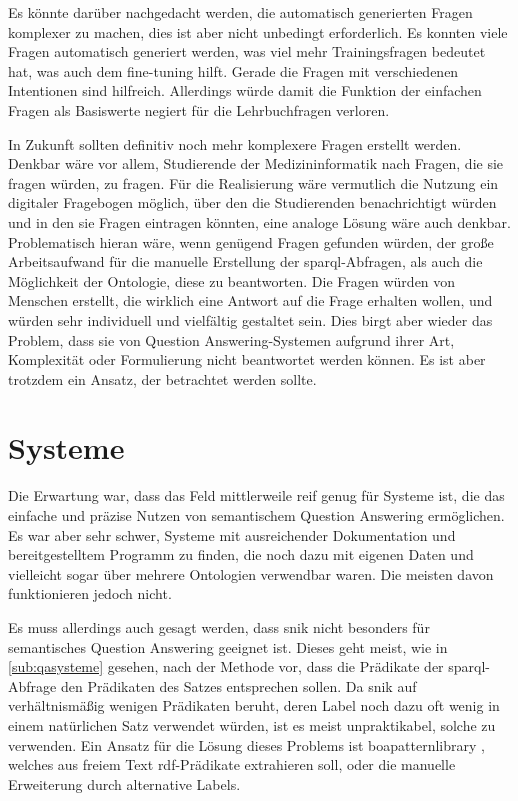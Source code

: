 Es könnte darüber nachgedacht werden, die automatisch generierten Fragen komplexer zu machen, dies ist aber nicht unbedingt erforderlich.
Es konnten viele Fragen automatisch generiert werden, was viel mehr Trainingsfragen bedeutet hat, was auch dem fine-tuning hilft.
Gerade die Fragen mit verschiedenen Intentionen sind hilfreich.
Allerdings würde damit die Funktion der einfachen Fragen als Basiswerte negiert für die Lehrbuchfragen verloren. 

In Zukunft sollten definitiv noch mehr komplexere Fragen erstellt werden.
Denkbar wäre vor allem, Studierende der Medizininformatik nach Fragen, die sie fragen würden, zu fragen.
Für die Realisierung wäre vermutlich die Nutzung ein digitaler Fragebogen möglich, über den die Studierenden benachrichtigt würden und in den sie Fragen eintragen könnten,
eine analoge Lösung wäre auch denkbar.
Problematisch hieran wäre, wenn genügend Fragen gefunden würden, der große Arbeitsaufwand für die manuelle Erstellung der \ac{sparql}-Abfragen, als auch die Möglichkeit der Ontologie, diese zu beantworten.
Die Fragen würden von Menschen erstellt, die wirklich eine Antwort auf die Frage erhalten wollen, und würden sehr individuell und vielfältig gestaltet sein.
Dies birgt aber wieder das Problem, dass sie von Question Answering-Systemen aufgrund ihrer Art, Komplexität oder Formulierung nicht beantwortet werden können.
Es ist aber trotzdem ein Ansatz, der betrachtet werden sollte.

\section{Systeme}

Die Erwartung war, dass das Feld mittlerweile reif genug für Systeme ist, die das einfache und präzise Nutzen von semantischem Question Answering ermöglichen.
Es war aber sehr schwer, Systeme mit ausreichender Dokumentation und bereitgestelltem Programm zu finden, die noch dazu mit eigenen Daten und vielleicht sogar über mehrere Ontologien verwendbar waren.
Die meisten davon funktionieren jedoch nicht.

Es muss allerdings auch gesagt werden, dass \ac{snik} nicht besonders für semantisches Question Answering geeignet ist.
Dieses geht meist, wie in \cref{sub:qasysteme} gesehen, nach der Methode vor, dass die Prädikate der \ac{sparql}-Abfrage den Prädikaten des Satzes entsprechen sollen.
Da \ac{snik} auf verhältnismäßig wenigen Prädikaten beruht, deren Label noch dazu oft wenig in einem natürlichen Satz verwendet würden, ist es meist unpraktikabel, solche zu verwenden.
Ein Ansatz für die Lösung dieses Problems ist \ac{boapatternlibrary} \citep{boa}, welches aus freiem Text \ac{rdf}-Prädikate extrahieren soll, oder die manuelle Erweiterung durch alternative Labels.


